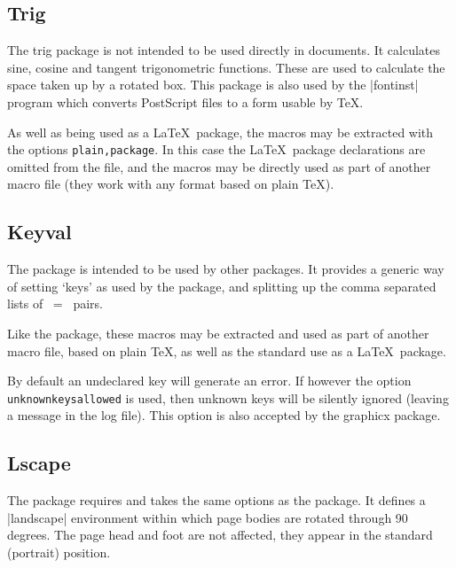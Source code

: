 \subsection{Trig}
The trig package is not intended to be used directly in documents. It
calculates sine, cosine and tangent trigonometric functions. These
are used to calculate the space taken up by a rotated box. This
package is also used by the |fontinst| program which converts
PostScript files to a form usable by \TeX.

As well as being used as a \LaTeX\ package, the macros may be extracted
with the  options \texttt{plain,package}. In this case
the \LaTeX\ package declarations are omitted from the file, and the
macros may be directly used as part of another macro file (they work
with any format based on plain \TeX).

\subsection{Keyval}
The  package is intended to be used by other
packages. It provides a generic way of setting `keys' as used by the
 package, and splitting up the comma separated lists
of ~=~ pairs.

Like the  package, these macros may be extracted and used
as part of another macro file, based on plain \TeX, as well as the
standard use as a \LaTeX\ package.

By default an undeclared key will generate an error.
If however the option  \texttt{unknownkeysallowed} is used, then
unknown keys will be silently ignored (leaving a message in the log
file). This option is also accepted by the \textsf{graphicx} package.

\subsection{Lscape}
The  package requires and takes the same options
as the  package. It defines a |landscape| environment
within which page bodies are rotated through 90 degrees. The page head
and foot are not affected, they appear in the standard (portrait)
position.

